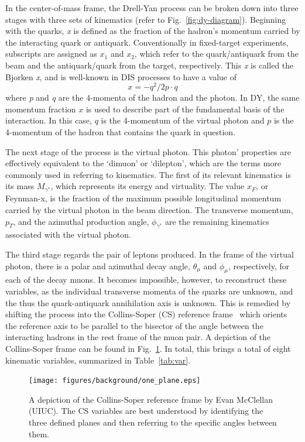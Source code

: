 In the center-of-mass frame, the Drell-Yan process can be broken down into three stages with three sets of kinematics (refer to Fig.~\ref{fig:dy-diagram}). Beginning with the quarks, \emph{x} is defined as the fraction of the hadron's momentum carried by the interacting quark or antiquark. Conventionally in fixed-target experiments, subscripts are assigned as $x_1$ and $x_2$, which refer to the quark/antiquark from the beam and the antiquark/quark from the target, respectively. This \emph{x} is called the Bjorken \emph{x}, and is well-known in DIS processes to have a value of
\begin{equation}
x = -q^2/2 p \cdot q
\end{equation} where \emph{p} and \emph{q} are the 4-momenta of the hadron and the photon. In DY, the same momentum fraction $x$ is used to describe part of the fundamental basis of the interaction. In this case, $q$ is the 4-momentum of the virtual photon and $p$ is the 4-momentum of the hadron that contains the quark in question.

The next stage of the process is the virtual photon. This photon' properties are effectively equivalent to the `dimuon' or `dilepton', which are the terms more commonly used in referring to kinematics. The first of its relevant kinematics is its mass $M_{\gamma^*}$, which represents its energy and virtuality. The value $x_F$, or Feynman-x, is the fraction of the maximum possible longitudinal momentum carried by the virtual photon in the beam direction. The transverse momentum, $p_T$, and the azimuthal production angle, $\phi_{\gamma^*}$ are the remaining kinematics associated with the virtual photon.

The third stage regards the pair of leptons produced. In the frame of the virtual photon, there is a polar and azimuthal decay angle, $\theta_\mu$ and $\phi_\mu$, respectively, for each of the decay muons. It becomes impossible, however, to reconstruct these variables, as the individual transverse momenta of the quarks are unknown, and the thus the quark-antiquark annihilation axis is unknown. This is remedied by shifting the process into the Collins-Soper (CS) reference frame~\cite{PhysRevD.16.2219} which orients the reference axis to be parallel to the bisector of the angle between the interacting hadrons in the rest frame of the muon pair. A depiction of the Collins-Soper frame can be found in Fig.~\ref{fig:collins-soper}. In total, this brings a total of eight kinematic variables, summarized in Table~\ref{tab:var}.
\begin{figure}
	\centering
	\texttt{[image: figures/background/one\_plane.eps]}
	\caption{A depiction of the Collins-Soper reference frame by Evan McClellan (UIUC). The CS variables are best understood by identifying the three defined planes and then referring to the specific angles between them.}
	\label{fig:collins-soper}
\end{figure}

